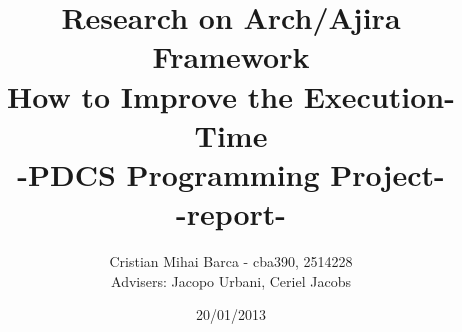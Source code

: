 \begin{titlepage}
\title{Research on Arch/Ajira Framework \\ How to Improve the Execution-Time \\ -PDCS Programming Project-  \\ -report-}
\author{Cristian Mihai Barca - cba390, 2514228 \\ Advisers: Jacopo Urbani, Ceriel Jacobs}
\date{20/01/2013}
\maketitle
\end{titlepage}
